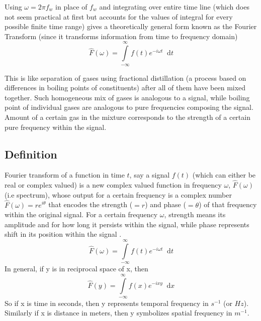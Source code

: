 \documentclass[11pt, a4paper]{article}
\newcommand{\diff}{\mathop{}\!\mathrm{d}}
\newcommand{\dx}{\diff x}
\newcommand{\dt}{\diff t}
\newcommand{\dint}[2]{\int \limits_{#1}^{#2}}  %
\newcommand{\intinfty}{\dint{-\infty}{\infty}}	%
\begin{document}
	Using $\omega = 2\pi f_{w}$ in place of $f_{w}$ and integrating over entire time line (which does not seem practical at first but accounts for the values of integral for every possible finite time range) gives a theoretically general form known as the Fourier Transform (since it transforms information from time to frequency domain)
	\begin{equation}\label{eq:com.wrapped_signal.FT_final}
		\hat{F}(\omega) = \intinfty f(t)e^{-i\omega t} \dt
	\end{equation}
	
	This is like separation of gases using fractional distillation (a process based on differences in boiling points of constituents) after all of them have been mixed together. Such homogeneous mix of gases is analogous to a signal, while boiling point of individual gases are analogous to pure frequencies composing the signal. Amount of a certain gas in the mixture corresponds to the strength of a certain pure frequency within the signal. 
	
	\subsection{Definition}\label{sec:fourier_transform_def}  %
	Fourier transform of a function in time $t$, say a signal $f(t)$ (which can either be real or complex valued) is a new complex valued function in frequency $\omega$, $\hat{F}(\omega)$ (i.e spectrum), whose output for a certain frequency is a complex number $\hat{F}(\omega)=re^{i\theta}$ that encodes the strength ($=r$) and phase ($=\theta$) of that frequency within the original signal. For a certain frequency $\omega$, strength means its amplitude and for how long it persists within the signal, while phase represents shift in its position within the signal \cite{herman2016fourieranalysis}.
	\begin{equation}\label{eq:ft_def}
		\boxed{
			\hat{F}(\omega) = \intinfty f(t)e^{-i\omega t} \dt
		}
	\end{equation}
	In general, if y is in reciprocal space of x, then
	\begin{equation*}\label{eq:ft_def_general}
		\hat{F}(y) = \intinfty f(x)e^{-ixy} \dx
	\end{equation*}
	So if x is time in seconds, then y represents temporal frequency in $s^{-1}$ (or $Hz$). Similarly if x is distance in meters, then y symbolizes spatial frequency in $m^{-1}$.
	
\end{document}

